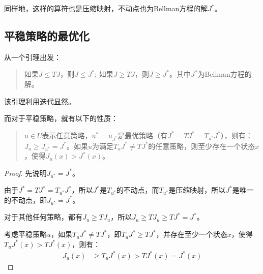 同样地，这样的算符也是压缩映射，不动点也为Bellman方程的解$J^*$。

\subsection{平稳策略的最优化}

从一个引理出发：

\begin{quotation}

    如果$J\leq TJ$，则$J\leq J^*$; 如果$J\geq TJ$，则$J\geq J^*$。其中$J^*$为Bellman方程的解。

\end{quotation}


该引理利用迭代显然。

而对于平稳策略，就有以下的性质：

\begin{quotation}

    $u\in U$表示任意策略，$u^*=u_{J^*}$是最优策略（有$J^*=TJ^*=T_{u^*}J^*$），则有：$J_u\geq J_{u^*}=J^*$。如果$u$为满足$T_uJ^*\neq TJ^*$的任意策略，则至少存在一个状态$x$，使得$J_u(x)>J^*(x)$。

\end{quotation}

\begin{proof}
    先说明$J_{u^*}=J^*$。

    由于$J^*=TJ^*=T_{u^*}J^*$，所以$J^*$是$T_{u^*}$的不动点，而$T_{u^*}$是压缩映射，所以$J^*$是唯一的不动点，即$J_{u^*}=J^*$。

    对于其他任何策略，都有$J_u\geq TJ_u$，所以$J_u\geq TJ_u\geq TJ^*=J^*$。

    考虑平稳策略$u$，如果$T_uJ^*\neq TJ^*$，即$T_uJ^*\geq TJ^*$，并存在至少一个状态$x$，使得$T_uJ^*(x)>TJ^*(x)$，则有：
    \begin{equation}
        \begin{aligned}
            J_u(x) & \geq T_uJ^*(x) > TJ^*(x) = J^*(x)
        \end{aligned}
    \end{equation}
\end{proof}


